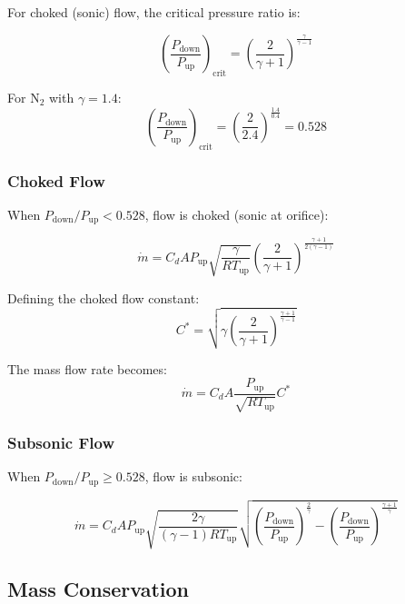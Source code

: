 \documentclass[11pt,a4paper]{article}
\begin{document}
For choked (sonic) flow, the critical pressure ratio is:

\begin{equation}
\left(\frac{P_{\text{down}}}{P_{\text{up}}}\right)_{\text{crit}} = \left(\frac{2}{\gamma + 1}\right)^{\frac{\gamma}{\gamma - 1}}
\end{equation}

For N$_2$ with $\gamma = 1.4$:
\begin{equation}
\left(\frac{P_{\text{down}}}{P_{\text{up}}}\right)_{\text{crit}} = \left(\frac{2}{2.4}\right)^{\frac{1.4}{0.4}} = 0.528
\end{equation}

\subsubsection{Choked Flow}

When $P_{\text{down}}/P_{\text{up}} < 0.528$, flow is choked (sonic at orifice):

\begin{equation}
\dot{m} = C_d A P_{\text{up}} \sqrt{\frac{\gamma}{R T_{\text{up}}}} \left(\frac{2}{\gamma + 1}\right)^{\frac{\gamma + 1}{2(\gamma - 1)}}
\end{equation}

Defining the choked flow constant:
\begin{equation}
C^* = \sqrt{\gamma \left(\frac{2}{\gamma + 1}\right)^{\frac{\gamma + 1}{\gamma - 1}}}
\end{equation}

The mass flow rate becomes:
\begin{equation}
\dot{m} = C_d A \frac{P_{\text{up}}}{\sqrt{R T_{\text{up}}}} C^*
\end{equation}

\subsubsection{Subsonic Flow}

When $P_{\text{down}}/P_{\text{up}} \geq 0.528$, flow is subsonic:

\begin{equation}
\dot{m} = C_d A P_{\text{up}} \sqrt{\frac{2\gamma}{(\gamma - 1) R T_{\text{up}}}} \sqrt{\left(\frac{P_{\text{down}}}{P_{\text{up}}}\right)^{\frac{2}{\gamma}} - \left(\frac{P_{\text{down}}}{P_{\text{up}}}\right)^{\frac{\gamma + 1}{\gamma}}}
\end{equation}

\subsection{Mass Conservation}
\end{document}
